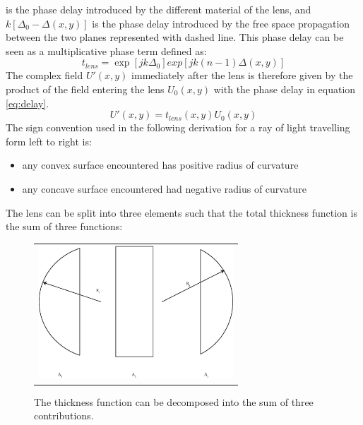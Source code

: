 is the phase delay introduced by the different material of the lens, and 
\begin{math}
	k[\Delta_0-\Delta(x,y)]
\end{math}
is the phase delay introduced by the free space propagation between the two planes represented with dashed line.
This phase delay can be seen as a multiplicative phase term defined as:
\begin{equation}
\label{eq:delay}
	t_{lens}=\exp[jk\Delta_0]exp[jk(n-1)\Delta(x,y)]
\end{equation}
The complex field 
\begin{math}
	U'(x,y)
\end{math}
immediately after the lens is therefore given by the product of the field entering the lens 
\begin{math}
	U_0(x,y)
\end{math} 
with the phase delay in equation \ref{eq:delay}.
\begin{equation}
\label{eq:disturbance}
	U'(x,y)=t_{lens}(x,y)U_0(x,y)
\end{equation}
The sign convention used in the following derivation for a ray of light travelling form left to right is: 
\begin{itemize}
	\item any convex surface encountered has positive radius of curvature
	\item any concave surface encountered had negative radius of curvature
\end{itemize}
The lens can be split into three elements such that the total thickness function is the sum of three functions:
\begin{figure}[h]
	\begin{center}
		\begin{tabular}{c}
				\includegraphics[height=5cm]{lens2.eps}
		\end{tabular}
	\end{center}
	\caption{ \label{fig:split} 
		The thickness function can be decomposed into the sum of three contributions. }
\end{figure} 
